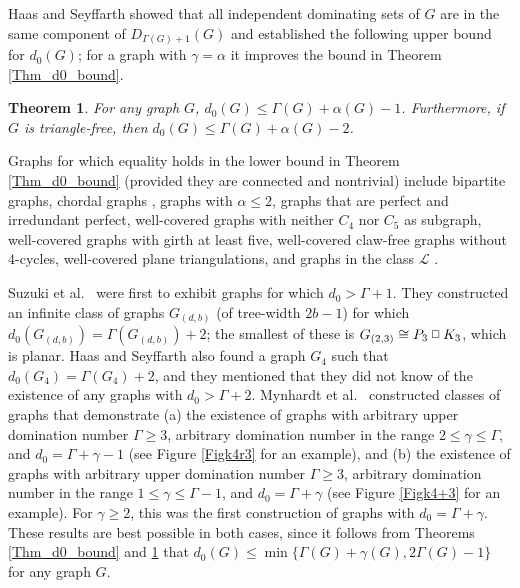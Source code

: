 \documentclass[12pt]{article}%
\newtheorem{theorem}{Theorem}[section]
\providecommand{\boksie}{\ensuremath{\mathbin{\raisebox{0.3mm}{$\scriptstyle\square$}}}}
\begin{document}
Haas and Seyffarth \cite{26CM-HS2017} showed that all independent dominating
sets of $G$ are in the same component of $D_{\Gamma(G)+1}(G)$ and established
the following upper bound for $d_{0}(G)$; for a graph with $\gamma=\alpha$ it
improves the bound in Theorem \ref{Thm_d0_bound}.

\begin{theorem}
\emph{\cite{26CM-HS2017}}\label{Thm_d0_bound2}\hspace{0.1in}For any graph $G$,
$d_{0}(G)\leq\Gamma(G)+\alpha(G)-1$. Furthermore, if $G$ is triangle-free,
then $d_{0}(G)\leq\Gamma(G)+\alpha(G)-2$.
\end{theorem}

Graphs for which equality holds in the lower bound in Theorem
\ref{Thm_d0_bound} (provided they are connected and nontrivial) include
bipartite graphs, chordal graphs \cite{26CM-HS2014}, graphs with $\alpha\leq
2$, graphs that are perfect and irredundant perfect, well-covered graphs with
neither $C_{4}$ nor $C_{5}$ as subgraph, well-covered graphs with girth at
least five, well-covered claw-free graphs without $4$-cycles, well-covered
plane triangulations, and graphs in the class $\mathcal{L}$ \cite{26CM-HS2017}.

Suzuki et al.~\cite{26CM-SMN} were first to exhibit graphs for which
$d_{0}>\Gamma+1$. They constructed an infinite class of graphs $G_{(d,b)}$ (of
tree-width $2b-1$) for which $d_{0}(G_{(d,b)})=\Gamma(G_{(d,b)})+2$; the
smallest of these is $G_{(2,3)}\cong P_{3}\boksie K_{3}$, which is planar.
Haas and Seyffarth \cite{26CM-HS2017} also found a graph $G_{4}$ such that
$d_{0}(G_{4})=\Gamma(G_{4})+2$, and they mentioned that they did not know of
the existence of any graphs with $d_{0}>\Gamma+2$. Mynhardt et
al.~\cite{26CM-MRT} constructed classes of graphs that demonstrate (a) the
existence of graphs with arbitrary upper domination number $\Gamma\geq3$,
arbitrary domination number in the range $2\leq\gamma\leq\Gamma$, and
$d_{0}=\Gamma+\gamma-1$ (see Figure \ref{Figk4r3} for an example), and (b) the
existence of graphs with arbitrary upper domination number $\Gamma\geq3$,
arbitrary domination number in the range $1\leq\gamma\leq\Gamma-1$, and
$d_{0}=\Gamma+\gamma$ (see Figure \ref{Figk4+3} for an example). For
$\gamma\geq2$, this was the first construction of graphs with $d_{0}%
=\Gamma+\gamma$. These results are best possible in both cases, since it
follows from Theorems \ref{Thm_d0_bound} and \ref{Thm_d0_bound2} that
$d_{0}(G)\leq\min\{\Gamma(G)+\gamma(G),2\Gamma(G)-1\}$ for any graph $G$.
\end{document}
